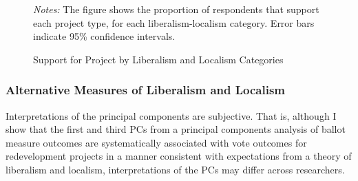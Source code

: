 \documentclass[article,11pt]{memoir}
\begin{document}
\begin{figure}\centering
  \caption{Support for Project by Liberalism and Localism Categories}
  \label{fig:g_lib_loc}
  \begin{measuredfigure}
  \end{measuredfigure}
  \begin{tablenotes}[flushleft]
    \item \hspace{-.2em}\emph{Notes:} The figure shows the proportion of respondents that support each project type, for each liberalism-localism category. Error bars indicate 95\% confidence intervals.
  \end{tablenotes}
\end{figure}

\subsubsection{Alternative Measures of Liberalism and Localism}

Interpretations of the principal components are subjective. That is, although I show that the first and third PCs from a principal components analysis of ballot measure outcomes are systematically associated with vote outcomes for redevelopment projects in a manner consistent with expectations from a theory of liberalism and localism, interpretations of the PCs may differ across researchers.  
\end{document}
